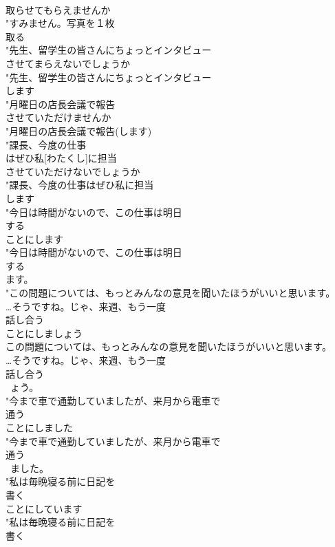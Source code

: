 \documentclass[8pt]{extreport}
\begin{document}
\begin{CJK}{UTF8}{min}
\\	取らせてもらえませんか
\\	"すみません。写真を１枚
\\	取る
\\	"先生、留学生の皆さんにちょっとインタビュー
\\	させてまらえないでしょうか
\\	"先生、留学生の皆さんにちょっとインタビュー
\\	します
\\	"月曜日の店長会議で報告
\\	させていただけませんか
\\	"月曜日の店長会議で報告(します)
\\	"課長、今度の仕事
\\	はぜひ私[わたくし]に担当
\\	させていただけないでしょうか
\\	"課長、今度の仕事はぜひ私に担当
\\	します
\\	"今日は時間がないので、この仕事は明日
\\	する
\\	ことにします
\\	"今日は時間がないので、この仕事は明日
\\	する
\\	ます。
\\	"この問題については、もっとみんなの意見を聞いたほうがいいと思います。
\\	…そうですね。じゃ、来週、もう一度
\\	話し合う
\\	ことにしましょう
\\	この問題については、もっとみんなの意見を聞いたほうがいいと思います。
\\	…そうですね。じゃ、来週、もう一度
\\	話し合う
\\	~ょう。
\\	"今まで車で通勤していましたが、来月から電車で
\\	通う
\\	ことにしました
\\	"今まで車で通勤していましたが、来月から電車で
\\	通う
\\	~ました。
\\	"私は毎晩寝る前に日記を
\\	書く
\\	ことにしています
\\	"私は毎晩寝る前に日記を
\\	書く

\end{CJK}
\end{document}
